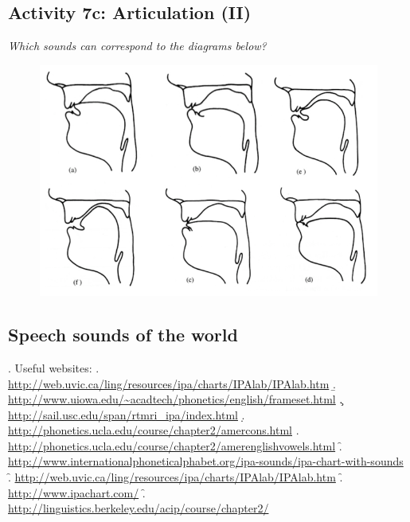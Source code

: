 \documentclass[11pt, oneside]{article}   	%
\begin{document}
\subsection{Activity 7c: Articulation (II)}

{\itshape Which sounds can correspond to the diagrams below?}

\begin{figure}[h!]
\centering
\includegraphics[scale=0.5]{articulation_ex}
\end{figure}

\subsection{Speech sounds of the world}

\ex. Useful websites:
	\a. \url{http://web.uvic.ca/ling/resources/ipa/charts/IPAlab/IPAlab.htm}
	\b. \url{http://www.uiowa.edu/~acadtech/phonetics/english/frameset.html}
	\c. \url{http://sail.usc.edu/span/rtmri_ipa/index.html}
	\d. \url{http://phonetics.ucla.edu/course/chapter2/amercons.html}
	\e. \url{http://phonetics.ucla.edu/course/chapter2/amerenglishvowels.html}
	\f. \url{http://www.internationalphoneticalphabet.org/ipa-sounds/ipa-chart-with-sounds}
	\f. \url{http://web.uvic.ca/ling/resources/ipa/charts/IPAlab/IPAlab.htm}
	\f. \url{http://www.ipachart.com/}
	\f. \url{http://linguistics.berkeley.edu/acip/course/chapter2/}
	
\end{document}
